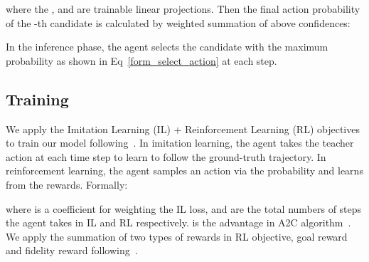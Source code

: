 \documentclass[sigconf]{acmart}
\begin{document}
where the ,  and  are trainable linear projections. Then the final action probability of the -th candidate is calculated by weighted summation of above confidences:

In the inference phase, the agent selects the candidate with the maximum probability as shown in Eq~\eqref{form_select_action} at each step.

\subsection{Training}
We apply the Imitation Learning (IL) + Reinforcement Learning (RL) objectives to train our model following~\cite{tan2019envdrop}. 
In imitation learning, the agent takes the teacher action  at each time step to learn to follow the ground-truth trajectory. 
In reinforcement learning, the agent samples an action  via the probability  and learns from the rewards. Formally:

where  is a coefficient for weighting the IL loss,  and  are the total numbers of steps the agent takes in IL and RL respectively.
 is the advantage in A2C algorithm~\cite{volo2016a3c}. 
We apply the summation of two types of rewards in RL objective, goal reward and fidelity reward following~\cite{jain2019r4r}. 
\end{document}
